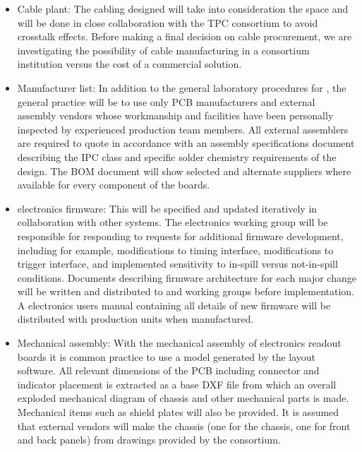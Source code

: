\begin{itemize}
\item Cable plant: The cabling designed will take into consideration the  space and will be done in close collaboration with the TPC  consortium to avoid crosstalk effects. %
Before making a final decision on cable procurement, we are investigating the possibility of cable manufacturing in a  consortium institution versus the cost of a commercial solution.  

\item Manufacturer list: In addition to the general laboratory procedures for , the general practice will be to use only PCB manufacturers and external assembly vendors whose workmanship and facilities have been personally inspected by experienced production team members. All external assemblers are required to quote in accordance with an assembly specifications document describing the IPC class and specific solder chemistry requirements of the design. The BOM document will show selected and alternate suppliers where available for every component of the  boards.

\item {} electronics firmware: This will be specified and updated iteratively in collaboration with other systems. The electronics working group will be responsible for responding to requests for additional firmware development, including for example, modifications to timing interface, modifications to trigger interface, and implemented sensitivity to in-spill versus not-in-spill conditions. Documents describing firmware architecture for each major change will be written and distributed to  and  working groups before implementation. A   electronics users manual containing all details of new firmware will be distributed with production units when manufactured.

\item Mechanical assembly: With the mechanical assembly of electronics readout boards it is common practice to use a \threed model generated by the layout software.  %
All relevant dimensions of the PCB including connector and indicator placement is extracted as a base DXF file from which an overall exploded mechanical diagram of chassis and other mechanical parts is made.  Mechanical items such as shield plates will also be provided. It is assumed that external vendors will make the  chassis %
(one for the chassis, one for front and back panels) from drawings provided by the consortium.

\end{itemize}

